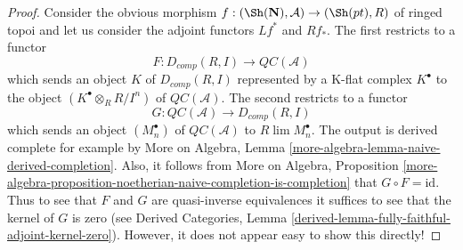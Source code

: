 \begin{proof}

Consider the obvious morphism
$f : (\Sh(\mathbf{N}), \mathcal{A}) \to (\Sh(pt), R)$
of ringed topoi
and let us consider the adjoint functors $Lf^*$ and $Rf_*$.
The first restricts to a functor
$$
F : D_{comp}(R, I) \longrightarrow \mathit{QC}(\mathcal{A})
$$
which sends an object $K$ of $D_{comp}(R, I)$ represented by a
K-flat complex $K^\bullet$ to the object $(K^\bullet \otimes_R R/I^n)$
of $\mathit{QC}(\mathcal{A})$. The second restricts to a functor
$$
G : \mathit{QC}(\mathcal{A}) \longrightarrow D_{comp}(R, I)
$$
which sends an object $(M_n^\bullet)$ of $\mathit{QC}(\mathcal{A})$
to $R\lim M_n^\bullet$. The output is derived complete for example
by More on Algebra, Lemma \ref{more-algebra-lemma-naive-derived-completion}.
Also, it follows from More on Algebra, Proposition
\ref{more-algebra-proposition-noetherian-naive-completion-is-completion}
that $G \circ F = \text{id}$. Thus to see that $F$ and $G$
are quasi-inverse equivalences it suffices to see that the kernel
of $G$ is zero (see Derived Categories, Lemma
\ref{derived-lemma-fully-faithful-adjoint-kernel-zero}).
However, it does not appear easy to show this directly!


\end{proof}
